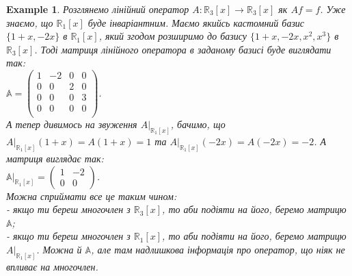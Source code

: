 \documentclass[a4paper, 10pt]{article}
\theoremstyle{theoremdd}
\newtheorem{example}[theorem]{Example}
\begin{document}
\begin{example}
Розглянемо лінійний оператор $A \colon \mathbb{R}_3[x] \to \mathbb{R}_3[x]$ як $Af = f$. Уже знаємо, що $\mathbb{R}_1[x]$ буде інваріантним. Маємо якийсь кастомний базис $\{1+x,-2x\}$ в $\mathbb{R}_1[x]$, який згодом розширимо до базису $\{1+x,-2x,x^2,x^3\}$ в $\mathbb{R}_3[x]$.
Тоді матриця лінійного оператора в заданому базисі буде виглядати так:\\
$\mathbb{A} = \begin{pmatrix}
1 & -2 & 0 & 0 \\
0 & 0 & 2 & 0 \\
0 & 0 & 0 & 3 \\
0 & 0 & 0 & 0 \\
\end{pmatrix}$.\\
А тепер дивимось на звуження $A|_{\mathbb{R}_1[x]}$, бачимо, що $A|_{\mathbb{R}_1[x]}(1+x) = A(1+x) = 1$ та $A|_{\mathbb{R}_1[x]}(-2x) = A(-2x) = -2$. А матриця виглядає так:\\
$\mathbb{A}|_{\mathbb{R}_1[x]} = \begin{pmatrix}
1 & -2 \\
0 & 0
\end{pmatrix}$.\\
Можна сприймати все це таким чином:\\
- якщо ти береш многочлен з $\mathbb{R}_3[x]$, то аби подіяти на його, беремо матрицю $\mathbb{A}$;\\
- якщо ти береш многочлен з $\mathbb{R}_1[x]$, то аби подіяти на його, беремо матрицю $A|_{\mathbb{R}_1[x]}$. Можна й $\mathbb{A}$, але там надлишкова інформація про оператор, що ніяк не впливає на многочлен.
\end{example}
\end{document}
